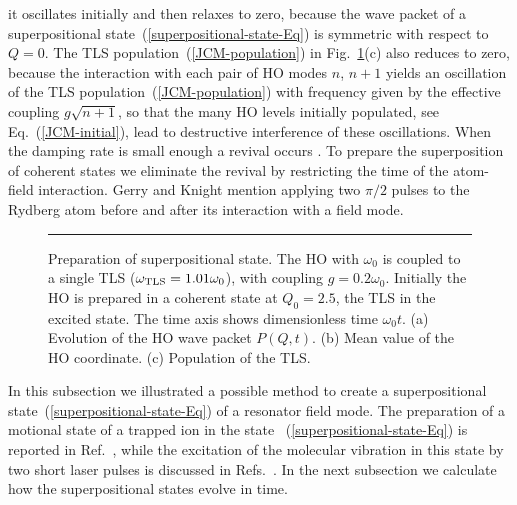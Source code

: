 \documentclass[12pt,twoside,a4paper]{report}
\begin{document}
it oscillates initially and then relaxes to zero, because the
wave packet
of a superpositional state~(\ref{superpositional-state-Eq})
is symmetric with respect to $Q=0$. 
The TLS population~(\ref{JCM-population}) in Fig.~\ref{fig1a}(c)
also reduces to zero,
because the interaction with each pair of HO modes $n$, $n+1$ yields
an oscillation of the TLS population~(\ref{JCM-population}) with
frequency given by the effective coupling $g\sqrt{n+1}$,
so that the many HO
levels initially populated, see Eq.~(\ref{JCM-initial}), lead to 
destructive interference of these oscillations. When the damping rate is small enough
a revival occurs \cite{plen98,shor93}.  
To prepare the superposition of coherent states we eliminate the
revival by restricting the time of the atom-field
interaction. 
Gerry and Knight \cite{gerr97} mention
applying two $\pi/2$ pulses to the Rydberg atom before and
after its interaction with a field mode.
\footnotesize\begin{figure}[!h]\centering
  \parbox{7cm}
  {\rule{-3cm}{0cm}\epsfxsize=11cm}
\caption[Preparation of superpositional state]
{\small  Preparation of superpositional state.
  The HO with 
  $\omega_0$ is coupled to a single TLS ($\omega_{\rm TLS}=1.01\omega_0$), with coupling $g=0.2\omega_0$.
  Initially the HO is prepared in a coherent state at $Q_0=2.5$, the TLS in the excited state.
  The time axis shows dimensionless time $\omega_0t$.
  (a) Evolution of the HO wave packet $P(Q,t)$.
  (b) Mean value of the HO coordinate.
  (c) Population of the TLS.
  \label{fig1a}}
  \end{figure}\normalsize

In this subsection we illustrated a possible method to
create a superpositional state~(\ref{superpositional-state-Eq}) of a resonator field
mode.  The preparation of a motional state of a trapped ion in the state
~(\ref{superpositional-state-Eq}) is reported in Ref.~\cite{6}, while the excitation of
the molecular vibration in this state by two short laser pulses is
discussed in Refs.~\cite{7,8}.  In the next subsection we calculate
how the superpositional states evolve in time.
\end{document}

